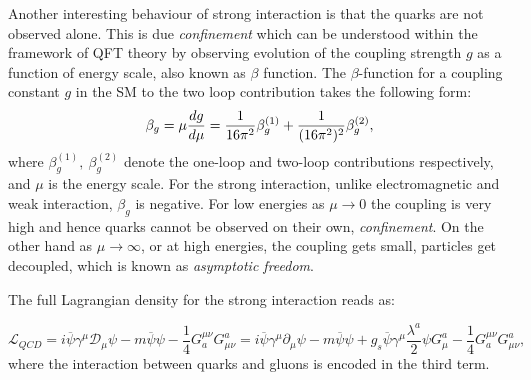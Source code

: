 Another interesting behaviour of strong interaction is that the quarks are not observed alone. This is due \textit{confinement} which can be understood within the framework of \gls{QFT} theory by observing evolution of the coupling strength $g$ as a function of energy scale, also known as $\beta$ function.
The $\beta$-function for a coupling constant $g$ in the \gls{SM} to the two loop contribution takes the following form:
\begin{equation}
\beta_g = \mu {{d g}\over d \mu} = {1\over16\pi^2} \beta_g^{(1)}
+ {1\over(16\pi^2)^2} \beta_g^{(2)},
\end{equation}
where $\beta_g^{(1)},~ \beta_g^{(2)}$ denote the one-loop and two-loop
contributions respectively, and $\mu$ is the energy scale. For the strong interaction, unlike electromagnetic and weak interaction, $\beta_g$ is negative. For low energies as $\mu \rightarrow 0$ the coupling is very high and hence quarks cannot be observed on their own, \textit{confinement}. On the other hand as $\mu \rightarrow \infty$, or at high energies, the coupling gets small, particles get decoupled, which is known as \textit{asymptotic freedom}. 

The full Lagrangian density for the strong interaction reads as:

\begin{equation}
	\mathcal{L}_{QCD} = i\overline{\psi}\gamma^{\mu}\mathcal{D}_{\mu}\psi - m\overline{\psi}\psi -\frac{1}{4} G_{a}^{\mu\nu}G^{a}_{\mu\nu} = i\overline{\psi}\gamma^{\mu}\partial_{\mu}\psi - m\overline{\psi}\psi + g_{s}\overline{\psi}\gamma^{\mu}\frac{\lambda^{a}}{2}\psi G^{a}_{\mu} -\frac{1}{4} G_{a}^{\mu\nu}G^{a}_{\mu\nu},
\label{eq:lag_fourth}
\end{equation}
where the interaction between quarks and gluons is encoded in the third term.


